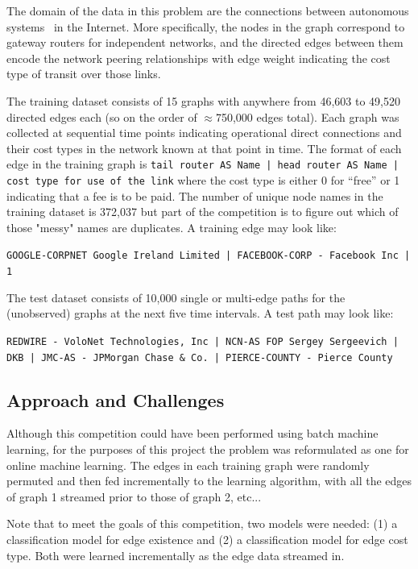 \documentclass{article} %
\begin{document}
The domain of the data in this problem are the connections between
autonomous systems~\cite{asn} in the Internet.  More specifically, the nodes
in the graph correspond to gateway routers for independent networks, and the
directed edges between them encode the network peering relationships with
edge weight indicating the cost type of transit over those links.

The training dataset consists of 15 graphs with anywhere from 46,603 to 49,520 directed edges each (so on the
order of $\approx$750,000 edges total).  Each graph was collected at sequential time
points indicating operational direct connections and their cost types in the
network known at that point in time.  The format of each edge in the
training graph is \texttt{tail router AS Name | head router AS
  Name | cost type for use of the link} where the cost type is either 0 for ``free'' or 1
indicating that a fee is to be paid.  The number of unique node names in the
training dataset is 372,037 but part of the competition is to figure out
which of those "messy" names are duplicates.  A training edge may look like:

\texttt{{\small GOOGLE-CORPNET Google Ireland Limited | FACEBOOK-CORP - Facebook Inc | 1}}

The test dataset consists of 10,000 single or multi-edge paths for the (unobserved)
graphs at the next five time intervals.  A test path may look like:

\texttt{{\small REDWIRE - VoloNet Technologies, Inc | NCN-AS FOP Sergey Sergeevich | DKB | JMC-AS - JPMorgan Chase \& Co. | PIERCE-COUNTY - Pierce County}}

\subsection{Approach and Challenges}

Although this competition could have been performed using batch machine
learning, for the purposes of this project the problem was reformulated as
one for online machine learning.  The edges in each training graph were
randomly permuted and then fed incrementally to the learning algorithm, with
all the edges of graph 1 streamed prior to those of graph 2, etc...

Note that to meet the goals of this competition, two models were needed: (1)
a classification model for edge existence and (2) a classification model for
edge cost type.  Both were learned incrementally as the edge data streamed in.
\end{document}
